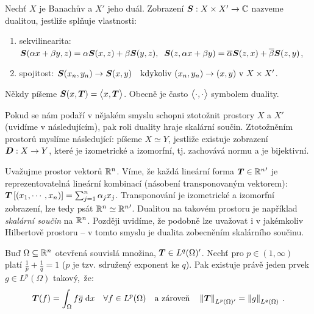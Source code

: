 \begin{definition}[Dualita]
Nechť $X$ je Banachův a $X'$ jeho duál. Zobrazení $\boldsymbol{S} : X \times X' \to \mathbb{C}$ nazveme dualitou, jestliže splňuje vlastnosti: \begin{enumerate}
    \item sekvilinearita: $\boldsymbol{S}(\alpha x + \beta y, z) = \alpha \boldsymbol{S}(x,z) + \beta \boldsymbol{S}(y,z), \;\; \boldsymbol{S}(z,\alpha x + \beta y) = \overline{\alpha} \boldsymbol{S}(z,x) + \overline{\beta} \boldsymbol{S}(z,y)$,
    
    \item spojitost: $\boldsymbol{S}(x_n,y_n) \rightarrow \boldsymbol{S}(x,y) \quad \text{kdykoliv } (x_n,y_n) \rightarrow (x,y) \text{ v } X \times X'$.
\end{enumerate}
Někdy píšeme $\boldsymbol{S}(x, \boldsymbol{T}) = \big< x, \boldsymbol{T} \big>$. Obecně je často $\big< \cdot, \cdot \big>$ symbolem duality.
\end{definition}

\begin{remark}
Pokud se nám podaří v nějakém smyslu schopni ztotožnit prostory $X$ a $X'$ (uvidíme v následujícím), pak roli duality hraje skalární součin. Ztotožněním prostorů myslíme následující: píšeme $X \simeq Y$, jestliže existuje zobrazení $\boldsymbol{D}: X \to Y$, které je izometrické a izomorfní, tj. zachovává normu a je bijektivní.
\end{remark}

\begin{example}

Uvažujme prostor vektorů $\mathbb{R}^n$. Víme, že každá lineární forma $\boldsymbol{T} \in {\mathbb{R}^n}'$ je reprezentovatelná lineární kombinací (násobení transponovaným vektorem): $\boldsymbol{T} \left[ (x_1, \cdots, x_n) \right] = \sum_{j=1}^n \alpha_j x_j$. Transponování je izometrické a izomorfní zobrazení, lze tedy psát $\mathbb{R}^n \simeq {\mathbb{R}^n}'$. Dualitou na takovém prostoru je například \textit{skalární součin} na $\mathbb{R}^n$. Později uvidíme, že podobně lze uvažovat i v jakémkoliv Hilbertově prostoru – v tomto smyslu je dualita zobecněním skalárního součinu.
\end{example}

\begin{theorem}
Buď $\Omega \subseteq \mathbb{R}^n $ otevřená souvislá množina, $\boldsymbol{T} \in L^q(\Omega)'$. Nechť pro $p \in (1, \infty)$ platí $\frac{1}{p} + \frac{1}{q} =1$ ($p$ je tzv. sdružený exponent ke $q$). Pak existuje právě jeden prvek $g \in L^p(\Omega)$ takový,~že:
$$
\boldsymbol{T}(f) = \int_\Omega f \overline{g} \;\mathrm{d}x \quad \forall f \in L^p(\Omega)
\quad \text{a zároveň} \quad
\left\lVert\boldsymbol{T}\right\rVert_{L^p(\Omega)'} = \left\lVert g\right\rVert_{L^q(\Omega)} \:.
$$

\end{theorem}

